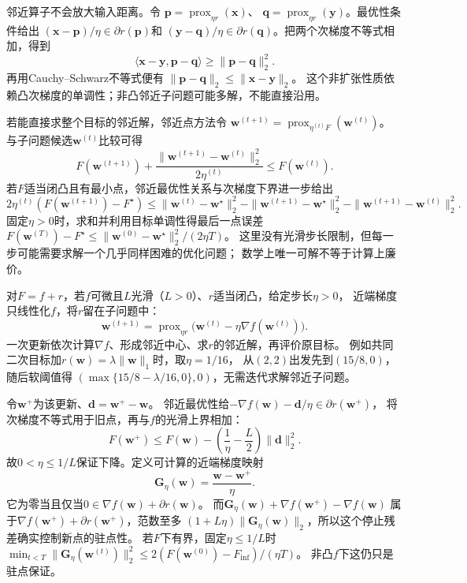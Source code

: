 邻近算子不会放大输入距离。令
$\bm{p}=\operatorname{prox}_{\eta r}(\bm{x})$、
$\bm{q}=\operatorname{prox}_{\eta r}(\bm{y})$。最优性条件给出
$(\bm{x}-\bm{p})/\eta\in\partial r(\bm{p})$和
$(\bm{y}-\bm{q})/\eta\in\partial r(\bm{q})$。把两个次梯度不等式相加，得到
\[
  \langle\bm{x}-\bm{y},\bm{p}-\bm{q}\rangle
  \geq\lVert\bm{p}-\bm{q}\rVert_2^2.
\]
再用Cauchy--Schwarz不等式便有
$\lVert\bm{p}-\bm{q}\rVert_2\leq\lVert\bm{x}-\bm{y}\rVert_2$。
这个非扩张性质依赖凸次梯度的单调性；非凸邻近子问题可能多解，不能直接沿用。

若能直接求整个目标的邻近解，邻近点方法令
$\bm w^{(t+1)}=\operatorname{prox}_{\eta^{(t)} F}(\bm w^{(t)})$。
与子问题候选$\bm w^{(t)}$比较可得
\[
 F(\bm w^{(t+1)})+\frac{\|\bm w^{(t+1)}-\bm w^{(t)}\|_2^2}{2\eta^{(t)}}
 \leq F(\bm w^{(t)}).
\]
若$F$适当闭凸且有最小点，邻近最优性关系与次梯度下界进一步给出
\[
 2\eta^{(t)}(F(\bm w^{(t+1)})-F^\star)
 \leq\|\bm w^{(t)}-\bm w^\star\|_2^2
 -\|\bm w^{(t+1)}-\bm w^\star\|_2^2
 -\|\bm w^{(t+1)}-\bm w^{(t)}\|_2^2.
\]
固定$\eta>0$时，求和并利用目标单调性得最后一点误差
$F(\bm w^{(T)})-F^\star\leq\|\bm w^{(0)}-\bm w^\star\|_2^2/(2\eta T)$。
这里没有光滑步长限制，但每一步可能需要求解一个几乎同样困难的优化问题；
数学上唯一可解不等于计算上廉价。

对$F=f+r$，若$f$可微且$L$光滑（$L>0$）、$r$适当闭凸，给定步长$\eta>0$，
近端梯度只线性化$f$，将$r$留在子问题中：
\begin{equation}
 \bm w^{(t+1)}
 =\operatorname{prox}_{\eta r}
   \bigl(\bm w^{(t)}-\eta\nabla f(\bm w^{(t)})\bigr).
 \label{eq:opt-proximal-gradient-update}
\end{equation}
一次更新依次计算$\nabla f$、形成邻近中心、求$r$的邻近解，再评价原目标。
例如共同二次目标加$r(\bm w)=\lambda\|\bm w\|_1$时，取$\eta=1/16$，
从$(2,2)$出发先到$(15/8,0)$，随后软阈值得
$(\max\{15/8-\lambda/16,0\},0)$，无需迭代求解邻近子问题。

令$\bm w^+$为该更新、$\bm d=\bm w^+-\bm w$。
邻近最优性给$-\nabla f(\bm w)-\bm d/\eta\in\partial r(\bm w^+)$，
将次梯度不等式用于旧点，再与$f$的光滑上界相加：
\begin{equation}
 F(\bm w^+)\leq F(\bm w)
 -\left(\frac1\eta-\frac L2\right)\|\bm d\|_2^2.
 \label{eq:opt-proximal-gradient-descent}
\end{equation}
故$0<\eta\leq1/L$保证下降。定义可计算的近端梯度映射
\[
 \bm G_\eta(\bm w)=\frac{\bm w-\bm w^+}{\eta}.
\]
它为零当且仅当$0\in\nabla f(\bm w)+\partial r(\bm w)$。
而$\bm G_\eta(\bm w)+\nabla f(\bm w^+)-\nabla f(\bm w)$
属于$\nabla f(\bm w^+)+\partial r(\bm w^+)$，范数至多
$(1+L\eta)\|\bm G_\eta(\bm w)\|_2$，所以这个停止残差确实控制新点的驻点性。
若$F$下有界，固定$\eta\leq1/L$时
$\min_{t<T}\|\bm G_\eta(\bm w^{(t)})\|_2^2
\leq2(F(\bm w^{(0)})-F_{\inf})/(\eta T)$。
非凸$f$下这仍只是驻点保证。

